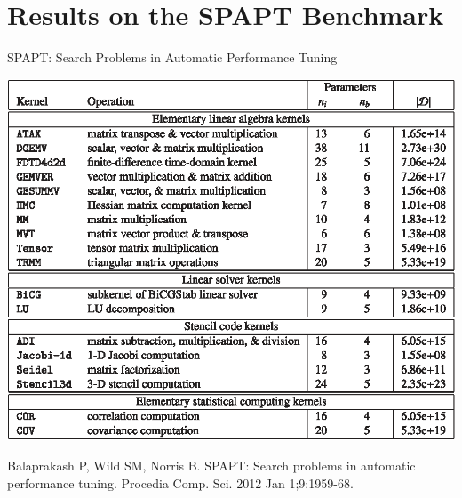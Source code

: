 \documentclass[10pt, compress, aspectratio=169, xcolor={table,usenames,dvipsnames}]{beamer}
\begin{document}
\section{Results on the SPAPT Benchmark}
\label{sec:org8b62288}
\begin{frame}[label={sec:org4707ffa}]{SPAPT: Search Problems in Automatic Performance Tuning}
\begin{center}
\begin{center}
\includegraphics[width=.58\columnwidth]{../img/balaprakash2012spapt.eps}
\end{center}

\vspace{-.2cm}
\scriptsize{Balaprakash P, Wild SM, Norris B. SPAPT: Search problems in automatic performance tuning. Procedia Comp. Sci. 2012 Jan 1;9:1959-68.}
\end{center}
\end{frame}
\end{document}
